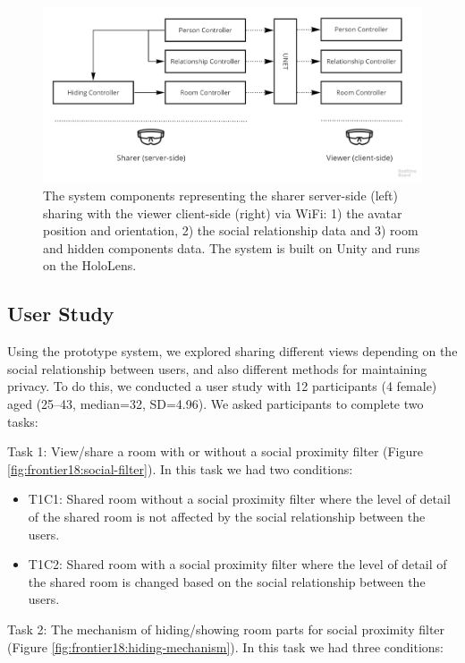 \begin{figure}
\begin{center}
\includegraphics[width=\linewidth]{images/frontier18/system.jpg}
\caption{The system components representing the sharer server-side (left) sharing with the viewer client-side (right) via WiFi: 1) the avatar position and orientation, 2) the social relationship data and 3) room and hidden components data. The system is built on Unity and runs on the HoloLens.}\label{fig:frontier18:system}
\end{center}
\end{figure}

\subsection{User Study}

Using the prototype system, we explored sharing different views depending on the social relationship between users, and also different methods for maintaining privacy. To do this, we conducted a user study with 12 participants (4 female) aged (25–43, median=32, SD=4.96). We asked participants to complete two tasks: 

Task 1: View/share a room with or without a social proximity filter (Figure \ref{fig:frontier18:social-filter}). In this task we had two conditions: 

\begin{itemize}
\item T1C1: Shared room without a social proximity filter where the level of detail of the shared room is not affected by the social relationship between the users.
\item T1C2: Shared room with a social proximity filter where the level of detail of the shared room is changed based on the social relationship between the users. 
\end{itemize}

Task 2: The mechanism of hiding/showing room parts for social proximity filter (Figure \ref{fig:frontier18:hiding-mechanism}). In this task we had three conditions:

